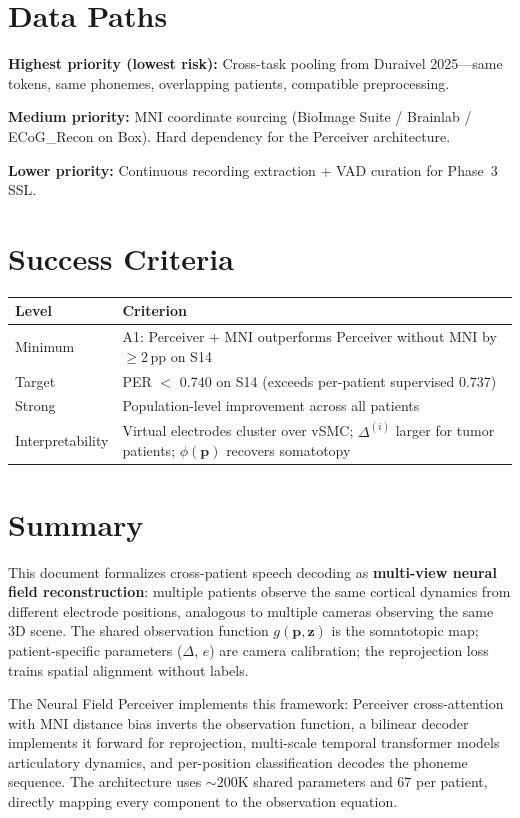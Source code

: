\documentclass[11pt,letterpaper]{article}
\newcommand{\pp}{\,\text{pp}}
\newcommand{\bfp}{\mathbf{p}}
\newcommand{\bfz}{\mathbf{z}}
\begin{document}
\section{Data Paths}

\textbf{Highest priority (lowest risk):} Cross-task pooling from Duraivel 2025---same tokens, same phonemes, overlapping patients, compatible preprocessing.

\textbf{Medium priority:} MNI coordinate sourcing (BioImage Suite / Brainlab / ECoG\_Recon on Box). Hard dependency for the Perceiver architecture.

\textbf{Lower priority:} Continuous recording extraction + VAD curation for Phase~3 SSL.


\section{Success Criteria}

\begin{table}[ht]\centering\small
\begin{tabular}{@{}lp{9cm}@{}}
\toprule
\textbf{Level} & \textbf{Criterion}\\
\midrule
Minimum & A1: Perceiver + MNI outperforms Perceiver without MNI by ${\geq}2\pp$ on S14\\
Target & PER $<$ 0.740 on S14 (exceeds per-patient supervised 0.737)\\
Strong & Population-level improvement across all patients\\
Interpretability & Virtual electrodes cluster over vSMC; $\Delta^{(i)}$ larger for tumor patients; $\phi(\bfp)$ recovers somatotopy\\
\bottomrule
\end{tabular}
\end{table}


\section{Summary}

This document formalizes cross-patient speech decoding as \textbf{multi-view neural field reconstruction}: multiple patients observe the same cortical dynamics from different electrode positions, analogous to multiple cameras observing the same 3D scene. The shared observation function $g(\bfp, \bfz)$ is the somatotopic map; patient-specific parameters ($\Delta$, $e$) are camera calibration; the reprojection loss trains spatial alignment without labels.

The Neural Field Perceiver implements this framework: Perceiver cross-attention with MNI distance bias inverts the observation function, a bilinear decoder implements it forward for reprojection, multi-scale temporal transformer models articulatory dynamics, and per-position classification decodes the phoneme sequence. The architecture uses ${\sim}200$K shared parameters and 67 per patient, directly mapping every component to the observation equation.
\end{document}

